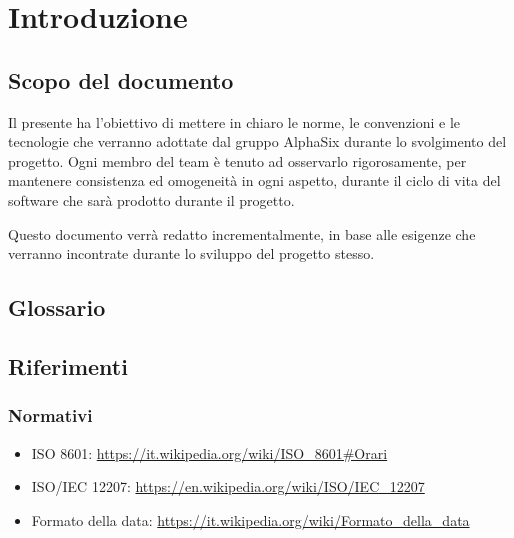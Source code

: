 \section{Introduzione}

\subsection{Scopo del documento} %
    Il presente  ha l’obiettivo di mettere in chiaro le norme, le convenzioni e le tecnologie
    che verranno adottate dal gruppo AlphaSix durante lo svolgimento del progetto\GAlt. Ogni membro del team
    \`e tenuto ad osservarlo rigorosamente, per mantenere consistenza ed omogeneit\`a in ogni aspetto, durante il ciclo di
    vita del software che sarà prodotto durante il progetto.\par
    Questo documento verr\`a redatto incrementalmente, in base alle esigenze che verranno incontrate durante lo sviluppo del
    progetto stesso.


\subsection{Glossario}


\subsection{Riferimenti}

    \subsubsection{Normativi}	\label{rifnorma}
    \begin{itemize}
    	\item ISO 8601: \url{https://it.wikipedia.org/wiki/ISO\_8601#Orari}
    	\item ISO/IEC 12207: \url{https://en.wikipedia.org/wiki/ISO/IEC_12207}
    	\item Formato della data: \url{https://it.wikipedia.org/wiki/Formato\_della\_data}
    \end{itemize}

